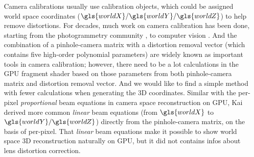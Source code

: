 Camera calibrations usually use calibration objects, which could be assigned world space coordinates (\(\gls{worldX}/\gls{worldY}/\gls{worldZ}\)) to help remove distortions. For decades, much work on camera calibration has been done, starting from the photogrammetry community \cite{photogrammetry01_1971, photogrammetry02_1975}, to computer vision \cite{Tsai1987, treeDcalibration1_1993, Zhengyou04}. And the combination of a pinhole-camera matrix with a distortion removal vector (which contains five high-order polynomial parameters) are widely known as important tools in camera calibration; however, there need to be a lot calculations in the \gls{GPU} fragment shader based on those parameters from both pinhole-camera matrix and distortion removal vector. And we would like to find a simple method with fewer calculations when generating the \gls{3D} coordinates. Similar with the per-pixel \emph{proportional} beam equations in camera space reconstruction on \gls{GPU}, Kai \cite{Kai10} derived more common \emph{linear} beam equations (from \(\gls{worldX}\) to \(\gls{worldY}/\gls{worldZ}\)) directly from the pinhole-camera matrix, on the basis of per-pixel. That \emph{linear} beam equations make it possible to show world space \gls{3D} reconstruction naturally on \gls{GPU}, but it did not contains infos about lens distortion correction. 
\\\indent
%
